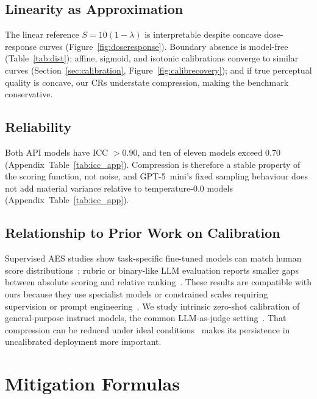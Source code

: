 \documentclass[11pt]{article}
\begin{document}
\subsection{Linearity as Approximation}

The linear reference $S=10(1-\lambda)$ is interpretable despite concave
dose-response curves (Figure~\ref{fig:doseresponse}). Boundary absence is
model-free (Table~\ref{tab:dist}); affine, sigmoid, and isotonic
calibrations converge to similar curves (Section~\ref{sec:calibration},
Figure~\ref{fig:calibrecovery}); and if true perceptual quality is
concave, our CRs understate compression, making the benchmark
conservative.



\subsection{Reliability}

Both API models have ICC $>0.90$, and ten of eleven models exceed 0.70
(Appendix~Table~\ref{tab:icc_app}). Compression is therefore a stable
property of the scoring function, not noise, and GPT-5~mini's fixed
sampling behaviour does not add material variance relative to
temperature-0.0 models (Appendix~Table~\ref{tab:icc_app}).



\subsection{Relationship to Prior Work on Calibration}

Supervised AES studies show task-specific fine-tuned models can match
human score distributions~\citep{ke2019automated}; rubric or binary-like
LLM evaluation reports smaller gaps between absolute scoring and relative
ranking~\citep{liu2023geval}. These results are compatible with ours
because they use specialist models or constrained scales requiring
supervision or prompt engineering~\citep{ke2019automated,liu2023geval}.
We study intrinsic zero-shot calibration of general-purpose instruct
models, the common LLM-as-judge setting~\citep{zheng2023judging}. That
compression can be reduced under ideal conditions~\citep{ke2019automated}
makes its persistence in uncalibrated deployment more important.




\section{Mitigation Formulas}
\label{app:mitigations}
\end{document}
